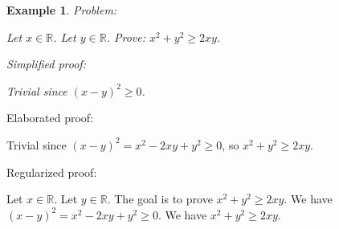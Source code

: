 \documentclass{article}
\newtheorem{example}{Example}
\begin{document}
\begin{example}
Problem:
\begin{tcolorbox}[colback=yellow!10, width=\linewidth]
Let $x\in\mathbb{R}$. Let $y\in\mathbb{R}$.
    Prove: $x^2 + y^2 \ge 2xy$.
\end{tcolorbox}

Simplified proof:
\begin{tcolorbox}[colback=blue!10, width=\linewidth]
Trivial since $(x-y)^2 \ge 0$.
\end{tcolorbox}
\end{example}

Elaborated proof:
\begin{tcolorbox}[colback=green!10, width=\linewidth]
Trivial since $(x-y)^2 = x^2 -2xy + y^2 \ge 0$, so $x^2 + y^2 \ge 2xy$.
\end{tcolorbox}

Regularized proof:
\begin{tcolorbox}[colback=red!10, width=\linewidth]
Let $x\in\mathbb{R}$.
Let $y\in\mathbb{R}$.
The goal is to prove $x^2 + y^2 \ge 2xy$.
We have ${{(x-y)}}^2 = x^2 -2xy + y^2 \ge 0$.
We have $x^2 + y^2 \ge 2xy$.
\end{tcolorbox}
\end{document}
